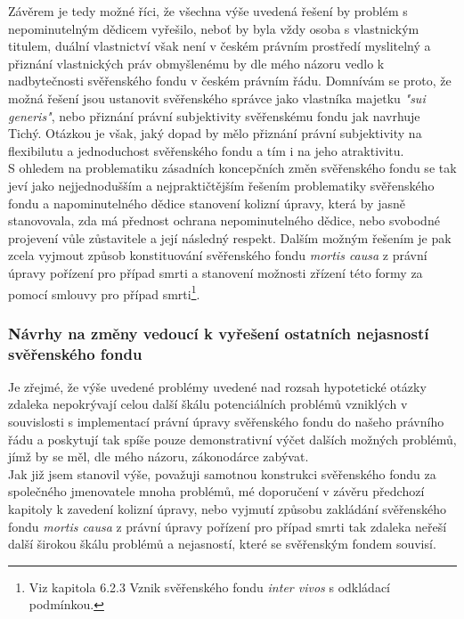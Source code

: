 \documentclass{article}
\begin{document}
Závěrem je tedy možné říci, že všechna výše uvedená řešení by problém s nepominutelným dědicem vyřešilo, neboť by byla vždy osoba s vlastnickým titulem, duální vlastnictví však není v českém právním prostředí myslitelný a přiznání vlastnických práv obmyšlenému by dle mého názoru vedlo k nadbytečnosti svěřenského fondu v českém právním řádu. Domnívám se proto, že možná řešení jsou ustanovit svěřenského správce jako vlastníka majetku \textit{"sui generis"}, nebo přiznání právní subjektivity svěřenskému fondu jak navrhuje Tichý. Otázkou je však, jaký dopad by mělo přiznání právní subjektivity na flexibilutu a jednoduchost svěřenského fondu a tím i na jeho atraktivitu.\\

S ohledem na problematiku zásadních koncepčních změn svěřenského fondu se tak jeví jako nejjednodušším a nejpraktičtějším řešením problematiky svěřenského fondu a napominutelného dědice stanovení kolizní úpravy, která by jasně stanovovala, zda má přednost ochrana nepominutelného dědice, nebo svobodné projevení vůle zůstavitele a její následný respekt. Dalším možným řešením je pak zcela vyjmout způsob konstituování svěřenského fondu \textit{mortis causa} z právní úpravy pořízení pro případ smrti a stanovení možnosti zřízení této formy za pomocí smlouvy pro případ smrti\footnote{Viz kapitola 6.2.3 Vznik svěřenského fondu \textit{inter vivos} s odkládací podmínkou.}.\\

\subsubsection{Návrhy na změny vedoucí k vyřešení ostatních nejasností svěřenského fondu}

Je zřejmé, že výše uvedené problémy uvedené nad rozsah hypotetické otázky zdaleka nepokrývají celou další škálu potenciálních problémů vzniklých v souvislosti s implementací právní úpravy svěřenského fondu do našeho právního řádu a poskytují tak spíše pouze demonstrativní výčet dalších možných problémů, jímž by se měl, dle mého názoru, zákonodárce zabývat.\\

Jak již jsem stanovil výše, považuji samotnou konstrukci svěřenského fondu za společného jmenovatele mnoha problémů, mé doporučení v závěru předchozí kapitoly k zavedení kolizní úpravy, nebo vyjmutí způsobu zakládání svěřenského fondu \textit{mortis causa} z právní úpravy pořízení pro případ smrti tak zdaleka neřeší další širokou škálu problémů a nejasností, které se svěřenským fondem souvisí.\\
\end{document}
